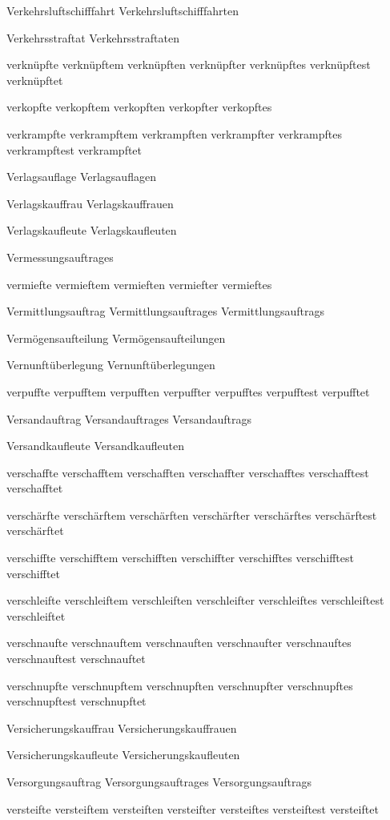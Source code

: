 Verkehrsluftschifffahrt
Verkehrsluftschifffahrten

Verkehrsstraftat
Verkehrsstraftaten

verknüpfte
verknüpftem
verknüpften
verknüpfter
verknüpftes
verknüpftest
verknüpftet

verkopfte
verkopftem
verkopften
verkopfter
verkopftes

verkrampfte
verkrampftem
verkrampften
verkrampfter
verkrampftes
verkrampftest
verkrampftet

Verlagsauflage
Verlagsauflagen

Verlagskauffrau
Verlagskauffrauen

Verlagskaufleute
Verlagskaufleuten

Vermessungsauftrages

vermiefte
vermieftem
vermieften
vermiefter
vermieftes

Vermittlungsauftrag
Vermittlungsauftrages
Vermittlungsauftrags

Vermögensaufteilung
Vermögensaufteilungen

Vernunftüberlegung
Vernunftüberlegungen

verpuffte
verpufftem
verpufften
verpuffter
verpufftes
verpufftest
verpufftet

Versandauftrag
Versandauftrages
Versandauftrags

Versandkaufleute
Versandkaufleuten

verschaffte
verschafftem
verschafften
verschaffter
verschafftes
verschafftest
verschafftet

verschärfte
verschärftem
verschärften
verschärfter
verschärftes
verschärftest
verschärftet

verschiffte
verschifftem
verschifften
verschiffter
verschifftes
verschifftest
verschifftet

verschleifte
verschleiftem
verschleiften
verschleifter
verschleiftes
verschleiftest
verschleiftet

verschnaufte
verschnauftem
verschnauften
verschnaufter
verschnauftes
verschnauftest
verschnauftet

verschnupfte
verschnupftem
verschnupften
verschnupfter
verschnupftes
verschnupftest
verschnupftet

Versicherungskauffrau
Versicherungskauffrauen

Versicherungskaufleute
Versicherungskaufleuten

Versorgungsauftrag
Versorgungsauftrages
Versorgungsauftrags

versteifte
versteiftem
versteiften
versteifter
versteiftes
versteiftest
versteiftet

